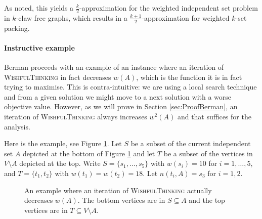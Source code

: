 As noted, this yields a $\frac{k}{2}$-approximation for the weighted independent set problem in $k$-claw free graphs, which results in a $\frac{k+1}{2}$-approximation for weighted $k$-set packing.

\paragraph{Instructive example} Berman \cite{Berman} proceeds with an example of an instance where an iteration of \textsc{WishfulThinking} in fact decreases $w(A)$, which is the function it is in fact trying to maximise. This is contra-intuitive: we are using a local search technique and from a given solution we might move to a next solution with a worse objective value. However, as we will prove in Section \ref{sec:ProofBerman}, an iteration of \textsc{WishfulThinking} always increases $w^2(A)$ and that suffices for the analysis.

Here is the example, see Figure \ref{fig:Example}. Let $S$ be a subset of the current independent set $A$ depicted at the bottom of Figure \ref{fig:Example} and let $T$ be a subset of the vertices in $V \setminus A$ depicted at the top. Write $S = \{s_1, \ldots, s_5\}$ with $w(s_i) = 10$ for $i=1,\ldots,5$, and $T = \{t_1, t_2\}$ with $w(t_1) = w(t_2) = 18$. Let $n(t_i,A) = s_3$ for $i=1,2$.


\begin{figure}
\centering
{}
\caption{An example where an iteration of \textsc{WishfulThinking} actually decreases $w(A)$. The bottom vertices are in $S \subseteq A$ and the top vertices are in $T \subseteq V \setminus A$.}
\label{fig:Example}
\end{figure}

